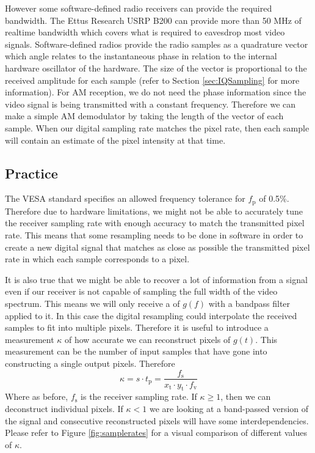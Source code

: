 \documentclass[a4paper,12pt,twoside,openright]{report}
\begin{document}
However some software-defined radio receivers can provide the required bandwidth. The Ettus Research USRP B200 can provide more than 50 MHz of realtime bandwidth which covers what is required to eavesdrop most video signals. Software-defined radios provide the radio samples as a quadrature vector which angle relates to the instantaneous phase in relation to the internal hardware oscillator of the hardware. The size of the vector is proportional to the received amplitude for each sample (refer to Section \ref{sec:IQSampling} for more information). For AM reception, we do not need the phase information since the video signal is being transmitted with a constant frequency. Therefore we can make a simple AM demodulator by taking the length of the vector of each sample. When our digital sampling rate matches the pixel rate, then each sample will contain an estimate of the pixel intensity at that time.

\subsection{Practice}
The VESA standard specifies an allowed frequency tolerance for $f_\text{p}$ of 0.5\%. Therefore due to hardware limitations, we might not be able to accurately tune the receiver sampling rate with enough accuracy to match the transmitted pixel rate. This means that some resampling needs to be done in software in order to create a new digital signal that matches as close as possible the transmitted pixel rate in which each sample corresponds to a pixel.

It is also true that we might be able to recover a lot of information from a signal even if our receiver is not capable of sampling the full width of the video spectrum. This means we will only receive a of $g(f)$ with a bandpass filter applied to it. In this case the digital resampling could interpolate the received samples to fit into multiple pixels. Therefore it is useful to introduce a measurement $\kappa$ of how accurate we can reconstruct pixels of $g(t)$. This measurement can be the number of input samples that have gone into constructing a single output pixels. Therefore
\begin{equation}
\label{eq:kappa}
\kappa = s \cdot t_\text{p} = \frac{f_\text{s}}{x_\text{t} \cdot y_\text{t} \cdot f_\text{v}}
\end{equation}
Where as before, $f_\text{s}$ is the receiver sampling rate. If $\kappa \geq 1$, then we can deconstruct individual pixels. If $\kappa < 1$ we are looking at a band-passed version of the signal and consecutive reconstructed pixels will have some interdependencies. Please refer to Figure \ref{fig:samplerates} for a visual comparison of different values of $\kappa$.
\end{document}
